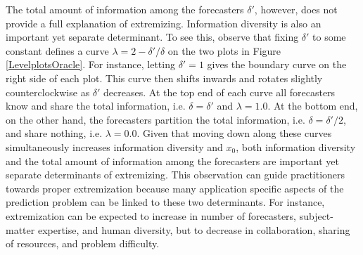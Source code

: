 \documentclass[11pt]{article}
\theoremstyle{definition}
\theoremstyle{definition}
\begin{document}
The total amount of information among the forecasters $\delta'$, however, does not provide a full
explanation of extremizing.  Information diversity is also an
important yet separate determinant.  To see this, observe that fixing $\delta'$ to
some constant defines a curve $\lambda = 2 - \delta'/\delta$ on the two plots in  Figure \ref{LevelplotsOracle}. For
instance, letting $\delta' = 1$ gives the boundary curve on the right
side of each plot.  This curve then shifts inwards and rotates slightly
counterclockwise as $\delta'$ decreases.  At the top end of each curve
all forecasters know and share the total information, i.e. $\delta =
\delta'$ and $\lambda = 1.0$.  At the bottom end, on the other hand,
the forecasters partition the total information, i.e. $\delta =
\delta'/2$, and share nothing, i.e. $\lambda = 0.0$.  Given that
moving down along these curves simultaneously increases information diversity and
$x_0$, both information diversity and the total amount of
information among the forecasters are important yet separate determinants of  extremizing. This observation can guide practitioners towards proper extremization because  many  application specific aspects of the prediction problem can be linked to these two determinants. For instance, extremization can be
expected to increase in number of forecasters,
subject-matter expertise, and human diversity, but to decrease in
collaboration, sharing of resources, and problem difficulty.

 
 
\end{document}
